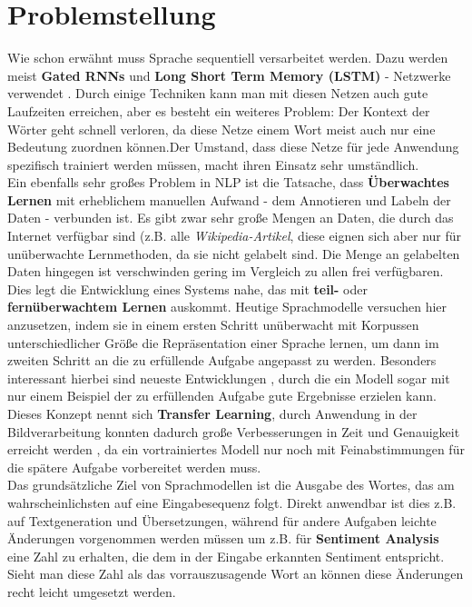 \section{Problemstellung}
Wie schon erw\"ahnt muss Sprache sequentiell versarbeitet werden. Dazu werden meist \textbf{Gated RNNs} und \textbf{Long Short Term Memory (LSTM)} - Netzwerke verwendet \cite{attention}. Durch einige Techniken kann man mit diesen Netzen auch gute Laufzeiten erreichen, aber es besteht ein weiteres Problem: Der Kontext der W\"orter geht schnell verloren, da diese Netze einem Wort meist auch nur eine Bedeutung zuordnen k\"onnen.Der Umstand, dass diese Netze f\"ur jede Anwendung spezifisch trainiert werden m\"ussen, macht ihren Einsatz sehr umst\"andlich.\\
Ein ebenfalls sehr gro{\ss}es Problem in NLP ist die Tatsache, dass \textbf{\"Uberwachtes Lernen} mit erheblichem manuellen Aufwand - dem Annotieren und Labeln der Daten - verbunden ist. Es gibt zwar sehr gro{\ss}e Mengen an Daten, die durch das Internet verf\"ugbar sind (z.B. alle \textit{Wikipedia-Artikel}, diese eignen sich aber nur f\"ur un\"uberwachte Lernmethoden, da sie nicht gelabelt sind. Die Menge an gelabelten Daten hingegen ist verschwinden gering im Vergleich zu allen frei verf\"ugbaren. Dies legt die Entwicklung eines Systems nahe, das mit \textbf{teil-} oder \textbf{fern\"uberwachtem Lernen} auskommt. Heutige Sprachmodelle versuchen hier anzusetzen, indem sie in einem ersten Schritt un\"uberwacht mit Korpussen unterschiedlicher Gr\"o{\ss}e die Repr\"asentation einer Sprache lernen, um dann im zweiten Schritt an die zu erf\"ullende Aufgabe angepasst zu werden. Besonders interessant hierbei sind neueste Entwicklungen \cite{gpt3}, durch die ein Modell sogar mit nur einem Beispiel der zu erf\"ullenden Aufgabe gute Ergebnisse erzielen kann. Dieses Konzept nennt sich \textbf{Transfer Learning}, durch Anwendung in der Bildverarbeitung konnten dadurch gro{\ss}e Verbesserungen in Zeit und Genauigkeit erreicht werden \cite{ulm}, da ein vortrainiertes Modell nur noch mit Feinabstimmungen f\"ur die sp\"atere Aufgabe vorbereitet werden muss.\\
Das grunds\"atzliche Ziel von Sprachmodellen ist die Ausgabe des Wortes, das am wahrscheinlichsten auf eine Eingabesequenz folgt. Direkt anwendbar ist dies z.B. auf Textgeneration und \"Ubersetzungen, w\"ahrend f\"ur andere Aufgaben leichte \"Anderungen vorgenommen werden m\"ussen um z.B. f\"ur \textbf{Sentiment Analysis} eine Zahl zu erhalten, die dem in der Eingabe erkannten Sentiment entspricht. Sieht man diese Zahl als das vorrauszusagende Wort an k\"onnen diese \"Anderungen recht leicht umgesetzt werden.


